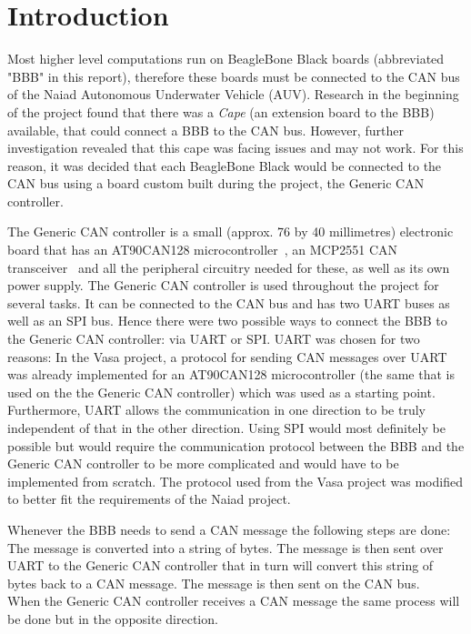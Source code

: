 
\section{Introduction}\label{sec:introduction}
Most higher level computations run on BeagleBone Black boards (abbreviated "BBB" in this report), therefore these boards must be connected to the CAN bus of the Naiad Autonomous Underwater Vehicle (AUV). Research in the beginning of the project found that there was a \emph{Cape} (an extension board to the BBB) available, that could connect a BBB to the CAN bus. However, further investigation revealed that this cape was facing issues and may not work. For this reason, it was decided that each BeagleBone Black would be connected to the CAN bus using a board custom built during the project, the Generic CAN controller. \newline
\pagebreak

The Generic CAN controller is a small (approx. 76 by 40 millimetres) electronic board that has an AT90CAN128 microcontroller~\cite{web:at90can}, an MCP2551 CAN transceiver~\cite{web:mcp2551} and all the peripheral circuitry needed for these, as well as its own power supply. The Generic CAN controller is used throughout the project for several tasks. It can be connected to the CAN bus and has two UART buses as well as an SPI bus. \newline
Hence there were two possible ways to connect the BBB to the Generic CAN controller: via UART or SPI. \newline
UART was chosen for two reasons: In the Vasa project, a protocol for sending CAN messages over UART was already implemented for an AT90CAN128 microcontroller (the same that is used on the the Generic CAN controller) which was used as a starting point. Furthermore, UART allows the communication in one direction to be truly independent of that in the other direction. Using SPI would most definitely be possible but would require the communication protocol between the BBB and the Generic CAN controller to be more complicated and would have to be implemented from scratch.  \newline
The protocol used from the Vasa project was modified to better fit the requirements of the Naiad project.

Whenever the BBB needs to send a CAN message the following steps are done: The message is converted into a string of bytes.  The message is then sent over UART to the Generic CAN controller that in turn will convert this string of bytes back to a CAN message. The message is then sent on the CAN bus. \\
When the Generic CAN controller receives a CAN message the same process will be done but in the opposite direction. 
\pagebreak